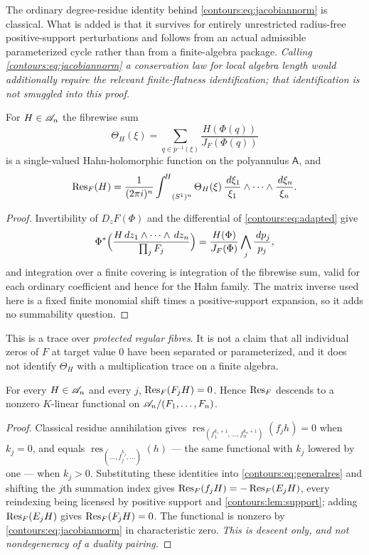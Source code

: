 \documentclass[11pt,letterpaper]{article}
\theoremstyle{definition}
\theoremstyle{remark}
\newcommand{\res}{\operatorname{res}}\newcommand{\wind}{\operatorname{wind}}
\newcommand{\HInt}{\mathop{\int^{\!H}}\nolimits}
\numberwithin{equation}{section}
\begin{document}
The ordinary degree-residue identity behind \eqref{contours:eq:jacobiannorm} is
classical. What is added is that it survives for entirely unrestricted
radius-free positive-support perturbations and follows from an actual admissible
parameterized cycle rather than from a finite-algebra package. \emph{Calling
\eqref{contours:eq:jacobiannorm} a conservation law for local algebra length
would additionally require the relevant finite-flatness identification; that
identification is not smuggled into this proof.}

\begin{corollary}
\label{contours:cor:protectedtrace}
For $H\in\mathscr A_n$ the fibrewise sum
\[
  \Theta_H(\xi)=\sum_{q\in p^{-1}(\xi)}
  \frac{H(\Phi(q))}{J_F(\Phi(q))}
\]
is a single-valued Hahn-holomorphic function on the polyannulus $\mathsf A$, and
\begin{equation}\label{contours:eq:finitetrace}
  \Res_F(H)=\frac1{(2\pi i)^n}
  \HInt_{(S^1)^n}\Theta_H(\xi)\,
  \frac{\dd\xi_1}{\xi_1}\wedge\cdots\wedge\frac{\dd\xi_n}{\xi_n} .
\end{equation}
\end{corollary}
\begin{proof}
Invertibility of $D_zF(\Phi)$ and the differential of
\eqref{contours:eq:adapted} give
\[
  \Phi^*\Bigl(\frac{H\,d z_1\wedge\cdots\wedge \,d z_n}{\prod_jF_j}\Bigr)
  =\frac{H(\Phi)}{J_F(\Phi)}\bigwedge_j\frac{\,d p_j}{p_j},
\]
and integration over a finite covering is integration of the fibrewise sum,
valid for each ordinary coefficient and hence for the Hahn family. The matrix
inverse used here is a fixed finite monomial shift times a positive-support
expansion, so it adds no summability question.
\end{proof}

This is a trace over \emph{protected regular fibres}. It is not a claim that all
individual zeros of $F$ at target value $0$ have been separated or
parameterized, and it does not identify $\Theta_H$ with a multiplication trace on
a finite algebra.

\begin{proposition}
\label{contours:prop:idealannihilation}
For every $H\in\mathscr A_n$ and every $j$, $\operatorname{Res}_F(F_jH)=0$. Hence $\operatorname{Res}_F$ descends to
a nonzero $K$-linear functional on $\mathscr A_n/(F_1,\ldots,F_n)$.
\end{proposition}
\begin{proof}
Classical residue annihilation gives
$\res_{(f_1^{k_1+1},\ldots,f_n^{k_n+1})}(f_jh)=0$ when $k_j=0$, and equals
$\res_{(\ldots,f_j^{k_j},\ldots)}(h)$ --- the same functional with $k_j$ lowered
by one --- when $k_j>0$. Substituting these identities into
\eqref{contours:eq:generalres} and shifting the $j$th summation index gives
$\operatorname{Res}_F(f_jH)=-\operatorname{Res}_F(E_jH)$, every reindexing being licensed by positive
support and \cref{contours:lem:support}; adding $\operatorname{Res}_F(E_jH)$ gives
$\operatorname{Res}_F(F_jH)=0$. The functional is nonzero by
\eqref{contours:eq:jacobiannorm} in characteristic zero. \emph{This is descent
only, and not nondegeneracy of a duality pairing.}
\end{proof}
\end{document}
